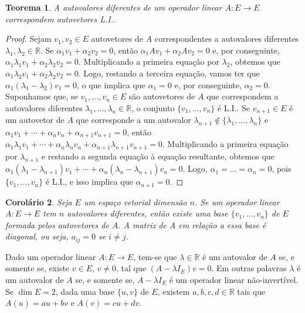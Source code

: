 \documentclass[12pt,a4paper]{article}
\newcommand{\R}{\mathbb{R}}
\newtheorem{thm}{Teorema}[section]
\newtheorem{cor}[thm]{Corolário}
\theoremstyle{definition}
\begin{document}
\begin{thm}
  A autovalores diferentes de um operador linear $A:E\to E$
  correspondem autovetores L.I..
\end{thm}
\begin{proof}
  Sejam $v_1,v_2\in E$ autovetores de $A$ correspondentes a
  autovalores diferentes $\lambda_1,\lambda_2\in\R$. Se
  $\alpha_1v_1+\alpha_2v_2=0$, então $\alpha_1Av_1+\alpha_2Av_2=0$ e,
  por conseguinte,
  $\alpha_1\lambda_1v_1+\alpha_2\lambda_2v_2=0$. Multiplicando a
  primeira equação por $\lambda_2$, obtemos que
  $\alpha_1\lambda_2v_1+\alpha_2\lambda_2v_2=0$. Logo, restando a
  terceira equação, vamos ter que
  $\alpha_1(\lambda_1-\lambda_2)v_1=0$, o que implica que $\alpha_1=0$
  e, por conseguinte, $\alpha_2=0$. Suponhamos que, se
  $v_1,\ldots,v_n\in E$ são autovetores de $A$ que correspondem a
  autovalores diferentes $\lambda_1,\ldots,\lambda_n\in\R$, o conjunto
  $\{v_1,\ldots,v_n\}$ é L.I.. Se $v_{n+1}\in E$ é um autovetor de $A$
  que corresponde a um autovalor
  $\lambda_{n+1}\not\in\{\lambda _1,\ldots,\lambda_n\}$ e
  $\alpha_1v_1+\cdots+\alpha_nv_n+\alpha_{n+1}v_{n+1}=0$, então
  $\alpha_1\lambda_1v_1+\cdots+\alpha_n\lambda_nv_n+\alpha_{n+1}\lambda_{n+1}v_{n+1}=0$. Multiplicando
  a primeira equação por $\lambda_{n+1}$ e restando a segunda equação
  à equação resultante, obtemos que
  $\alpha_1(\lambda_1-\lambda_{n+1})v_1+\cdots+\alpha_n(\lambda_n-\lambda_{n+1})v_n=0$. Logo,
  $\alpha_1=\ldots=\alpha_n=0$, pois $\{v_1,\ldots,v_n\}$ é L.I., e
  isso implica que $\alpha_{n+1}=0$.
\end{proof}

\begin{cor}
  Seja $E$ um espaço vetorial dimensão $n$. Se um operador linear
  $A:E\to E$ tem $n$ autovalores diferentes, então existe uma base
  $\{v_1,\ldots,v_n\}$ de $E$ formada pelos autovetores de $A$. A
  matriz de $A$ em relação a essa base é \emph{diagonal}, ou seja,
  $a_{ij}=0$ se $i\ne j$.
\end{cor}

Dado um operador linear $A:E\to E$, tem-se que $\lambda\in\R$ é um
autovalor de $A$ se, e somente se, existe $v\in E$, $v\ne 0$, tal que
$(A-\lambda I_E)v=0$. Em outras palavras $\lambda$ é um autovalor de
$A$ se, e somente se, $A-\lambda I_E$ é um operador linear
não-invertível. Se $\dim E=2$, dada uma base $\{u,v\}$ de $E$, existem
$a,b,c,d\in\R$ tais que $A(u)=au+bv$ e $A(v)=cu+dv$.
\end{document}
